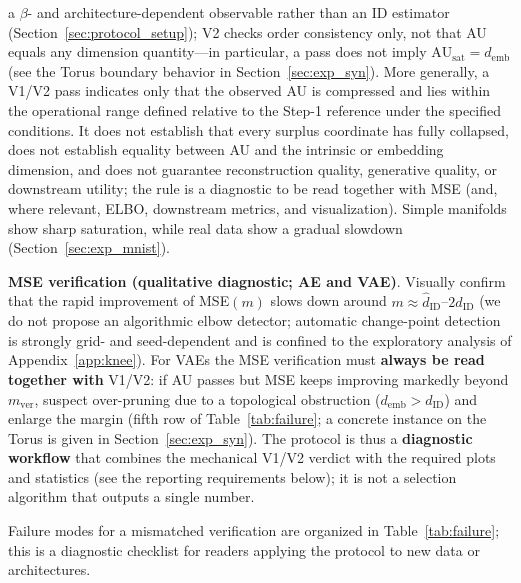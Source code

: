 \documentclass[make,article,submit,pdftex,moreauthors]{Definitions/mdpi}
\newcommand{\dID}{d_{\mathrm{ID}}}
\newcommand{\hatdID}{\hat{d}_{\mathrm{ID}}}
\newcommand{\AUsat}{\mathrm{AU}_{\mathrm{sat}}}
\newcommand{\demb}{d_{\mathrm{emb}}}
\begin{document}
a $\beta$- and architecture-dependent observable rather than an ID
estimator (Section~\ref{sec:protocol_setup}); V2 checks order consistency
only, not that AU equals any dimension quantity---in particular, a pass
does not imply $\AUsat = \demb$ (see the Torus boundary behavior in
Section~\ref{sec:exp_syn}).
More generally, a V1/V2 pass indicates only that the observed AU is
compressed and lies within the operational range defined relative to the
Step-1 reference under the
specified conditions.
It does not establish that every surplus coordinate has fully collapsed,
does not establish equality between AU and the intrinsic or embedding
dimension, and does not guarantee reconstruction quality, generative
quality, or downstream utility; the rule is a diagnostic to be read
together with MSE (and, where relevant, ELBO, downstream metrics, and
visualization).
Simple manifolds show sharp saturation, while real data show a gradual
slowdown (Section~\ref{sec:exp_mnist}).

\textbf{MSE verification (qualitative diagnostic; AE and VAE)}.
Visually confirm that the rapid improvement of MSE$(m)$ slows down
around $m \approx \hatdID$--$2\hatdID$ (we do not propose an
algorithmic elbow detector; automatic change-point detection is
strongly grid- and seed-dependent and is confined to the exploratory
analysis of Appendix~\ref{app:knee}).
For VAEs the MSE verification must \textbf{always be read together with}
V1/V2: if AU passes but MSE keeps improving markedly beyond
$m_{\mathrm{ver}}$, suspect over-pruning due to a topological obstruction
($\demb > \dID$) and enlarge the margin (fifth row of
Table~\ref{tab:failure}; a concrete instance on the Torus is given in
Section~\ref{sec:exp_syn}).
The protocol is thus a \textbf{diagnostic workflow} that combines the
mechanical V1/V2 verdict with the required plots and statistics (see the
reporting requirements below); it is not a selection algorithm that outputs
a single number.

Failure modes for a mismatched verification are organized in
Table~\ref{tab:failure}; this is a diagnostic checklist for readers applying
the protocol to new data or architectures.
\end{document}
